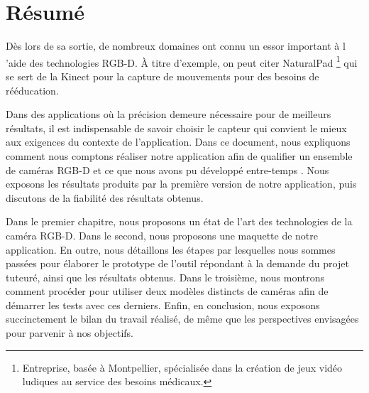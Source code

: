 \documentclass[a4paper, 12pt]{book}
\newcounter{program}[subsection]
\begin{document}
\chapter*{Résumé}
Dès lors de sa sortie, de nombreux domaines ont connu un essor important à l 'aide des technologies RGB-D. À titre d'exemple, on peut citer NaturalPad \footnote{Entreprise, basée à Montpellier, spécialisée dans la création de jeux vidéo ludiques au service des besoins médicaux.} qui se sert de la Kinect pour la capture de mouvements pour des besoins de rééducation.	
\par Dans des applications où la précision demeure nécessaire pour de meilleurs résultats, il est indispensable de savoir choisir le capteur qui convient le mieux aux exigences du contexte de l'application.
Dans ce document, nous expliquons comment nous comptons réaliser notre application afin de qualifier un ensemble de caméras RGB-D et ce que nous avons pu développé entre-temps . Nous exposons les résultats produits par la première version de notre application, puis discutons de la fiabilité des résultats obtenus.
\par Dans le premier chapitre, nous proposons un état de l'art des technologies de la caméra RGB-D. Dans le second, nous proposons une maquette de notre application. En outre, nous détaillons les étapes par lesquelles nous sommes passées pour élaborer le prototype de l'outil répondant à la demande du projet tuteuré, ainsi que les résultats obtenus. Dans le troisième, nous montrons comment procéder pour utiliser deux modèles distincts de caméras afin de démarrer les tests avec ces derniers. Enfin, en conclusion, nous exposons succinctement le bilan du travail réalisé, de même que les perspectives envisagées pour parvenir à nos objectifs.

\tableofcontents
\listoffigures
\mainmatter
\end{document}
